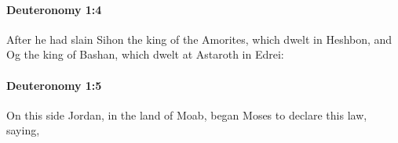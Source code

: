 		\paragraph{Deuteronomy 1:4} %
			\label{DEUTERONOMY-1-4}

			After he had slain Sihon the king of the Amorites, which dwelt in Heshbon, and Og the king of Bashan, which dwelt at Astaroth in Edrei:


		\paragraph{Deuteronomy 1:5} %
			\label{DEUTERONOMY-1-5}

			On this side Jordan, in the land of Moab, began Moses to declare this law, saying,


